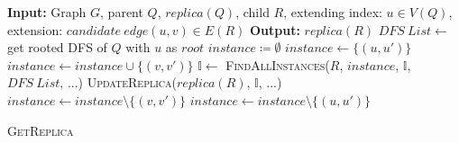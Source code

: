 \begin{algorithm}
	\dontprintsemicolon
	\nonl \textbf{Input:} Graph $G$, parent $Q$, $replica(Q)$, child $R$, extending index: $u\in V(Q)$, extension: $candidate\ edge (u,v) \in E(R)$\;
	\nonl \textbf{Output:} $replica(R)$ \;
	$DFS\ List\leftarrow$ get rooted \textsc{DFS} of $Q$ with $u$ as $root$ \;
	$instance \coloneq \emptyset$\;
	{
		$instance\leftarrow \{(u,u')\}$ \;
		{
			$instance\leftarrow instance \cup \{(v,v')\}$\;
			$\mathbb{I}\leftarrow$ \textsc{FindAllInstances($R$, $instance$, $\mathbb{I}$, $DFS\ List$, ...)}\;
			\textsc{UpdateReplica($replica(R)$, $\mathbb{I}$, ...)}\;
			$instance\leftarrow instance \setminus \{(v,v')\}$\;
		}
		$instance\leftarrow instance \setminus \{(u,u')\}$\;
	}
	\caption{\textsc{GetReplica}}\label{algo:search}
\end{algorithm}


